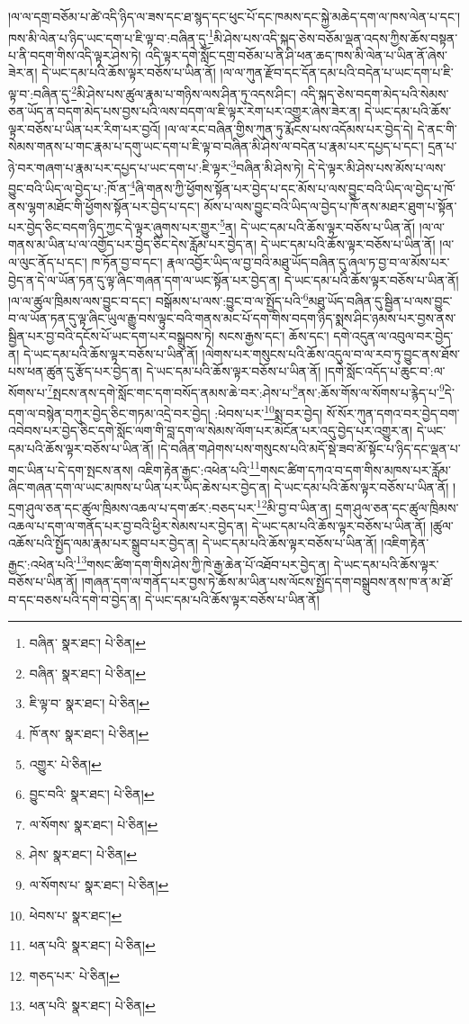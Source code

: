 །ལ་ལ་དགྲ་བཅོམ་པ་ཚེ་འདི་ཉིད་ལ་ཟས་དང་ཐ་སྙད་དང་ཕུང་པོ་དང་ཁམས་དང་སྐྱེ་མཆེད་དག་ལ་ཁས་ལེན་པ་དང་། ཁས་མི་ལེན་པ་ཉིད་ཡང་དག་པ་ཇི་ལྟ་བ་:བཞིན་དུ་\footnote{བཞིན་  སྣར་ཐང་།  པེ་ཅིན། }མི་ཤེས་པས་འདི་སྐད་ཅེས་བཅོམ་ལྡན་འདས་ཀྱིས་ཆོས་བསྟན་པ་ནི་བདག་གིས་འདི་ལྟར་ཤེས་ཏེ། འདི་ལྟར་དགེ་སློང་དགྲ་བཅོམ་པ་ནི་ཤི་ཕན་ཆད་ཁས་མི་ལེན་པ་ཡིན་ནོ་ཞེས་ཟེར་ན། དེ་ཡང་དམ་པའི་ཆོས་ལྟར་བཅོས་པ་ཡིན་ནོ། །ལ་ལ་ཀུན་རྫོབ་དང་དོན་དམ་པའི་བདེན་པ་ཡང་དག་པ་ཇི་ལྟ་བ་:བཞིན་དུ་\footnote{བཞིན་  སྣར་ཐང་།  པེ་ཅིན། }མི་ཤེས་པས་ཚུལ་རྣམ་པ་གཉིས་ལས་ཤིན་ཏུ་འདས་ཤིང་། འདི་སྐད་ཅེས་བདག་མེད་པའི་སེམས་ཅན་ཡོད་ན་བདག་མེད་པས་བྱས་པའི་ལས་བདག་ལ་ཇི་ལྟར་རེག་པར་འགྱུར་ཞེས་ཟེར་ན། དེ་ཡང་དམ་པའི་ཆོས་ལྟར་བཅོས་པ་ཡིན་པར་རིག་པར་བྱའོ། །ལ་ལ་རང་བཞིན་གྱིས་ཀུན་ཏུ་རྨོངས་པས་འདོམས་པར་བྱེད་དེ། དེ་ནང་གི་སེམས་གནས་པ་གང་རྣམ་པ་དགུ་ཡང་དག་པ་ཇི་ལྟ་བ་བཞིན་མི་ཤེས་ལ་བདེན་པ་རྣམ་པར་དཔྱད་པ་དང་། དྲན་པ་ཉེ་བར་གཞག་པ་རྣམ་པར་དཔྱད་པ་ཡང་དག་པ་:ཇི་ལྟར་\footnote{ཇི་ལྟ་བ་  སྣར་ཐང་།  པེ་ཅིན། }བཞིན་མི་ཤེས་ཏེ། དེ་དེ་ལྟར་མི་ཤེས་པས་མོས་པ་ལས་བྱུང་བའི་ཡིད་ལ་བྱེད་པ་:ཁོ་ན་\footnote{ཁོ་ནས་  སྣར་ཐང་།  པེ་ཅིན། }ཞི་གནས་ཀྱི་ཕྱོགས་སྟོན་པར་བྱེད་པ་དང་མོས་པ་ལས་བྱུང་བའི་ཡིད་ལ་བྱེད་པ་ཁོ་ནས་ལྷག་མཐོང་གི་ཕྱོགས་སྟོན་པར་བྱེད་པ་དང་། མོས་པ་ལས་བྱུང་བའི་ཡིད་ལ་བྱེད་པ་ཁོ་ནས་མཐར་ཐུག་པ་སྟོན་པར་བྱེད་ཅིང་བདག་ཉིད་ཀྱང་དེ་ལྟར་ཞུགས་པར་གྱུར་\footnote{འགྱུར་  པེ་ཅིན། }ན། དེ་ཡང་དམ་པའི་ཆོས་ལྟར་བཅོས་པ་ཡིན་ནོ། །ལ་ལ་གནས་མ་ཡིན་པ་ལ་འགྱོད་པར་བྱེད་ཅིང་དེས་རློམ་པར་བྱེད་ན། དེ་ཡང་དམ་པའི་ཆོས་ལྟར་བཅོས་པ་ཡིན་ནོ། །ལ་ལ་ལུང་ནོད་པ་དང་། ཁ་ཏོན་བྱ་བ་དང་། རྣལ་འབྱོར་ཡིད་ལ་བྱ་བའི་མཐུ་ཡོད་བཞིན་དུ་ཞལ་ཏ་བྱ་བ་ལ་མོས་པར་བྱེད་ན་དེ་ལ་ཡོན་ཏན་དུ་ལྟ་ཞིང་གཞན་དག་ལ་ཡང་སྟོན་པར་བྱེད་ན། དེ་ཡང་དམ་པའི་ཆོས་ལྟར་བཅོས་པ་ཡིན་ནོ། །ལ་ལ་ཚུལ་ཁྲིམས་ལས་བྱུང་བ་དང་། བསྒོམས་པ་ལས་:བྱུང་བ་ལ་སྤྱོད་པའི་\footnote{བྱུང་བའི་  སྣར་ཐང་།  པེ་ཅིན། }མཐུ་ཡོད་བཞིན་དུ་སྦྱིན་པ་ལས་བྱུང་བ་ལ་ཡོན་ཏན་དུ་ལྟ་ཞིང་ཡུལ་རྒྱུ་བས་ལྟུང་བའི་གནས་མང་པོ་དག་གིས་བདག་ཉིད་སྨས་ཤིང་ཉམས་པར་བྱས་ནས་སྦྱིན་པར་བྱ་བའི་དངོས་པོ་ཡང་དག་པར་བསྒྲུབས་ཏེ། སངས་རྒྱས་དང་། ཆོས་དང་། དགེ་འདུན་ལ་འབུལ་བར་བྱེད་ན། དེ་ཡང་དམ་པའི་ཆོས་ལྟར་བཅོས་པ་ཡིན་ནོ། །ལེགས་པར་གསུངས་པའི་ཆོས་འདུལ་བ་ལ་རབ་ཏུ་བྱུང་ནས་ཐོས་པས་ཕན་ཚུན་དུ་རྩོད་པར་བྱེད་ན། དེ་ཡང་དམ་པའི་ཆོས་ལྟར་བཅོས་པ་ཡིན་ནོ། །དགེ་སློང་འདོད་པ་ཆུང་བ་:ལ་སོགས་པ་\footnote{ལ་སོགས་  སྣར་ཐང་།  པེ་ཅིན། }སྤངས་ནས་དགེ་སློང་གང་དག་བསོད་ནམས་ཆེ་བར་:ཤེས་པ་\footnote{ཤེས་  སྣར་ཐང་།  པེ་ཅིན། }ནས་:ཆོས་གོས་ལ་སོགས་པ་རྙེད་པ་\footnote{ལ་སོགས་པ་  སྣར་ཐང་།  པེ་ཅིན། }དེ་དག་ལ་བསྙེན་བཀུར་བྱེད་ཅིང་གཏམ་འདྲེ་བར་བྱེད། :ཕེབས་པར་\footnote{ཕེབས་པ་  སྣར་ཐང་། }སྨྲ་བར་བྱེད། སོ་སོར་ཀུན་དགའ་བར་བྱེད་བག་འབེབས་པར་བྱེད་ཅིང་དགེ་སློང་ལག་གི་བླ་དག་ལ་སེམས་ལོག་པར་མངོན་པར་འདུ་བྱེད་པར་འགྱུར་ན། དེ་ཡང་དམ་པའི་ཆོས་ལྟར་བཅོས་པ་ཡིན་ནོ། །དེ་བཞིན་གཤེགས་པས་གསུངས་པའི་མདོ་སྡེ་ཟབ་མོ་སྟོང་པ་ཉིད་དང་ལྡན་པ་གང་ཡིན་པ་དེ་དག་སྤངས་ནས། འཇིག་རྟེན་རྒྱང་:འཕེན་པའི་\footnote{ཕན་པའི་  སྣར་ཐང་།  པེ་ཅིན། }གསང་ཚིག་དཀའ་བ་དག་གིས་མཁས་པར་རློམ་ཞིང་གཞན་དག་ལ་ཡང་མཁས་པ་ཡིན་པར་ཡིད་ཆེས་པར་བྱེད་ན། དེ་ཡང་དམ་པའི་ཆོས་ལྟར་བཅོས་པ་ཡིན་ནོ། །དྲག་ཤུལ་ཅན་དང་ཚུལ་ཁྲིམས་འཆལ་པ་དག་ཚར་:བཅད་པར་\footnote{གཅད་པར་  པེ་ཅིན། }མི་བྱ་བ་ཡིན་ན། དྲག་ཤུལ་ཅན་དང་ཚུལ་ཁྲིམས་འཆལ་པ་དག་ལ་གནོད་པར་བྱ་བའི་ཕྱིར་སེམས་པར་བྱེད་ན། དེ་ཡང་དམ་པའི་ཆོས་ལྟར་བཅོས་པ་ཡིན་ནོ། །ཚུལ་འཆོས་པའི་སྤྱོད་ལམ་རྣམ་པར་སྒྲུབ་པར་བྱེད་ན། དེ་ཡང་དམ་པའི་ཆོས་ལྟར་བཅོས་པ་ཡིན་ནོ། །འཇིག་རྟེན་རྒྱང་:འཕེན་པའི་\footnote{ཕན་པའི་  སྣར་ཐང་།  པེ་ཅིན། }གསང་ཚིག་དག་གིས་ཤེས་ཀྱི་ཁེ་རྒྱ་ཆེན་པོ་འཐོབ་པར་བྱེད་ན། དེ་ཡང་དམ་པའི་ཆོས་ལྟར་བཅོས་པ་ཡིན་ནོ། །གཞན་དག་ལ་གནོད་པར་བྱས་ཏེ་ཆོས་མ་ཡིན་པས་ལོངས་སྤྱོད་དག་བསྒྲུབས་ནས་ཁ་ན་མ་ཐོ་བ་དང་བཅས་པའི་དགེ་བ་བྱེད་ན། དེ་ཡང་དམ་པའི་ཆོས་ལྟར་བཅོས་པ་ཡིན་ནོ། 